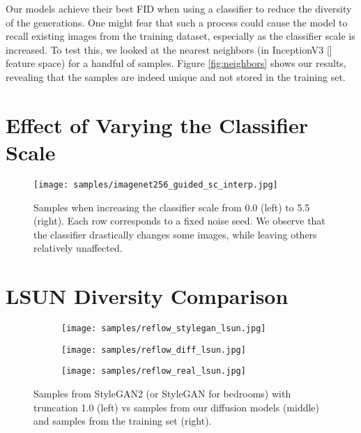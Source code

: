 \documentclass{article}
\newcommand{\shortcite}[1]{[\citenum{#1}]}
\begin{document}
Our models achieve their best FID when using a classifier to reduce the diversity of the generations. One might fear that such a process could cause the model to recall existing images from the training dataset, especially as the classifier scale is increased. To test this, we looked at the nearest neighbors (in InceptionV3 \shortcite{inceptionv3} feature space) for a handful of samples. Figure \ref{fig:neighbors} shows our results, revealing that the samples are indeed unique and not stored in the training set.

\section{Effect of Varying the Classifier Scale}
\begin{figure}[h]
    \centering
    \texttt{[image: samples/imagenet256\_guided\_sc\_interp.jpg]}
    \caption{Samples when increasing the classifier scale from 0.0 (left) to 5.5 (right). Each row corresponds to a fixed noise seed. We observe that the classifier drastically changes some images, while leaving others relatively unaffected.}
    \label{fig:varyingscale}
\end{figure}

\clearpage
\section{LSUN Diversity Comparison}

\begin{figure}[h]
    \begin{center}
    \begin{subfigure}[]{0.31\textwidth}
    \centerline{\texttt{[image: samples/reflow\_stylegan\_lsun.jpg]}}
    \end{subfigure}\quad
    \begin{subfigure}[]{0.31\textwidth}
    \centerline{\texttt{[image: samples/reflow\_diff\_lsun.jpg]}}
    \end{subfigure}\quad
    \begin{subfigure}[]{0.31\textwidth}
    \centerline{\texttt{[image: samples/reflow\_real\_lsun.jpg]}}
    \end{subfigure}
    \caption{\label{fig:diversity_lsun} Samples from StyleGAN2 (or StyleGAN for bedrooms) with truncation 1.0 (left) vs samples from our diffusion models (middle) and samples from the training set (right).}
    \end{center}
\end{figure}
\end{document}
